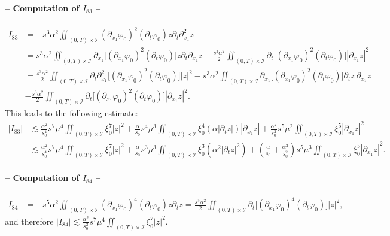 \documentclass[a4paper, 12pt]{article}
\theoremstyle{plain}
\theoremstyle{definition}
\numberwithin{theorem}{section}
\numberwithin{equation}{section}
\begin{document}
{%
\paragraph{-- Computation of $I_{83}$ --}
\begin{align*}
I_{83}&=-s^3\alpha^2\iint_{(0,T)\times\mathcal{I}}(\partial_{x_1}\varphi_0)^2(\partial_t\varphi_0)z\partial_t\partial^2_{x_1}z\\
&=s^3\alpha^2\iint_{(0,T)\times\mathcal{I}}\partial_{x_1}\big[(\partial_{x_1}\varphi_0)^2(\partial_t\varphi_0)\big]z\partial_t\partial_{x_1}z-\frac{s^3\alpha^2}{2}\iint_{(0,T)\times\mathcal{I}}\partial_t\big[(\partial_{x_1}\varphi_0)^2(\partial_t\varphi_0)\big]|\partial_{x_1}z|^2\\
&=\frac{s^3\alpha^2}{2}\iint_{(0,T)\times\mathcal{I}}\partial_t\partial^2_{x_1}\big[(\partial_{x_1}\varphi_0)^2(\partial_t\varphi_0)\big]|z|^2-s^3\alpha^2\iint_{(0,T)\times\mathcal{I}}\partial_{x_1}\big[(\partial_{x_1}\varphi_0)^2(\partial_t\varphi_0)\big]\partial_tz~\partial_{x_1}z\\
&-\frac{s^3\alpha^2}{2}\iint_{(0,T)\times\mathcal{I}}\partial_t\big[(\partial_{x_1}\varphi_0)^2(\partial_t\varphi_0)\big]|\partial_{x_1}z|^2. \end{align*}
This leads to the following estimate:
\begin{align*}
|I_{83}| &\lesssim \frac{\alpha^2}{s_0^4} s^7\mu^4\iint_{(0,T)\times\mathcal{I}}\xi_0^7|z|^2+\frac{\alpha}{s_0} s^4\mu^3\iint_{(0,T)\times\mathcal{I}}\xi_0^4(\alpha|\partial_tz|)|\partial_{x_1}z|+\frac{\alpha^2}{s_0^2} s^5\mu^2\iint_{(0,T)\times\mathcal{I}}\xi_0^5|\partial_{x_1}z|^2\\
&\lesssim \frac{\alpha^2}{s_0^4} s^7\mu^4\iint_{(0,T)\times\mathcal{I}}\xi_0^7|z|^2+\frac{\alpha}{s_0} s^3\mu^3\iint_{(0,T)\times\mathcal{I}}\xi_0^3(\alpha^2|\partial_tz|^2)+\left(\frac{\alpha}{s_0}+\frac{\alpha^2}{s_0^2}\right) s^5\mu^3\iint_{(0,T)\times\mathcal{I}}\xi_0^5|\partial_{x_1}z|^2.
\end{align*}
\paragraph{-- Computation of $I_{84}$ --}
\begin{align*}
I_{84}&=-s^5\alpha^2\iint_{(0,T)\times\mathcal{I}}(\partial_{x_1}\varphi_0)^4(\partial_t\varphi_0)z\partial_tz=\frac{s^5\alpha^2}{2}\iint_{(0,T)\times\mathcal{I}}\partial_t\big[(\partial_{x_1}\varphi_0)^4(\partial_t\varphi_0)\big]|z|^2,\end{align*}
and therefore
$\displaystyle |I_{84}|\lesssim \frac{\alpha^2}{s_0^2} s^7\mu^4\iint_{(0,T)\times\mathcal{I}}\xi_0^7|z|^2.$

}
\end{document}
